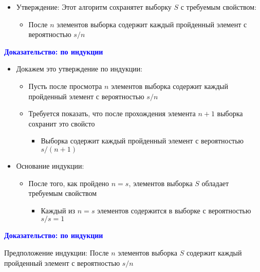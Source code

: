 \documentclass[landscape]{slides}
\begin{document}
\begin{normalsize}
\begin{slide}
\begin{itemize}
\item Утверждение: Этот алгоритм сохранятет выборку $S$ с требуемым свойством:

  \begin{itemize}
  \item После $n$ элементов выборка содержит каждый пройденный элемент с вероятностью $s/n$
  \end{itemize}
\end{itemize}
\end{slide}


\begin{slide}
\textbf{\textcolor{blue}{Доказательство: по индукции}}

\begin{itemize}
\item Докажем это утверждение по индукции:

  \begin{itemize}
  \item Пусть после просмотра $n$ элементов выборка содержит каждый пройденный элемент с вероятностью $s/n$

  \item Требуется показать, что после прохождения элемента $n+1$ выборка сохранит это свойсто

    \begin{itemize}
    \item Выборка содержит каждый пройденный элемент с вероятностью $s/(n+1)$
    \end{itemize}
  \end{itemize}

\item Основание индукции:

  \begin{itemize}
  \item После того, как пройдено $n=s$, элементов выборка $S$ обладает требуемым свойством

    \begin{itemize}
    \item Каждый из $n=s$ элементов содержится в выборке с вероятностью $s/s = 1$
    \end{itemize}
  \end{itemize}
\end{itemize}
\end{slide}


\begin{slide}
\textbf{\textcolor{blue}{Доказательство: по индукции}}

Предположение индукции: После $n$ элементов выборка $S$ содержит каждый пройденный элемент с вероятностью $s/n$


\end{slide}
\end{normalsize}
\end{document}
